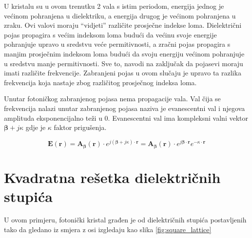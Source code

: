 \documentclass[utf8, seminar, numeric]{fer}
\begin{document}
U kristalu su u ovom trenutku 2 vala s istim periodom, energija jednog je
većinom pohranjena u dielektriku, a energija drugog je većinom pohranjena
u zraku. Ovi valovi moraju ``vidjeti'' različite prosječne indekse loma.
Dielektrični pojas propagira s većim indeksom loma budući da većinu svoje energije
pohranjuje upravo u sredstvu veće permitivnosti, a zračni pojas
propagira s manjim prosječnim indeksom loma budući da svoju energiju
većinom pohranjuje u sredstvu manje permitivnosti. Sve to, navodi na zaključak
da pojasevi moraju imati različite frekvencije. Zabranjeni pojas u ovom
slučaju je upravo ta razlika frekvencija koja nastaje zbog različitog prosječnog
indeksa loma.

\FloatBarrier
Unutar fotoničkog zabranjenog pojasa nema propagacije vala. Val čija se
frekvencija nalazi unutar zabranjenog pojasa naziva je evanescentni val i
njegova amplituda eksponencijalno teži u 0. Evanescentni val ima kompleksni valni
vektor ${\bm{\beta}} + j \kappa$ gdje je $\kappa$ faktor prigušenja.

\begin{equation} \label{eq:evan}
	\mathbf{E}(\mathbf{r}) =
	\mathbf{A}_{\bm{\beta}}(\mathbf{r}) \cdot
		e^{j ({\bm{\beta}} + j \kappa) \cdot \mathbf{r}} =
	\mathbf{A}_{\bm{\beta}}(\mathbf{r}) \cdot
		e^{j {\bm{\beta}} \cdot \mathbf{r}} e^{-\kappa \cdot \mathbf{r}}
\end{equation}


\section{Kvadratna rešetka dielektričnih stupića}

U ovom primjeru, fotonički kristal građen je od dielektričnih stupića
postavljenih tako da gledano iz smjera z osi izgledaju kao slika
\ref{fig:square_lattice}
\end{document}
